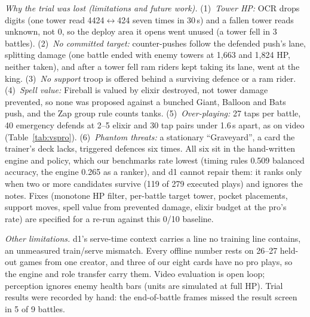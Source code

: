 \emph{Why the trial was lost (limitations and future work).} (1)~\emph{Tower HP:} OCR drops digits (one tower read 4424$\leftrightarrow$424 seven times in 30\,s) and a fallen tower reads unknown, not 0, so the deploy area it opens went unused (a tower fell in 3 battles). (2)~\emph{No committed target:} counter-pushes follow the defended push's lane, splitting damage (one battle ended with enemy towers at 1,663 and 1,824 HP, neither taken), and after a tower fell ram riders kept taking its lane, \ie went at the king. (3)~\emph{No support} troop is offered behind a surviving defence or a ram rider. (4)~\emph{Spell value:} Fireball is valued by elixir destroyed, not tower damage prevented, so none was proposed against a bunched Giant, Balloon and Bats push, and the Zap group rule counts tanks. (5)~\emph{Over-playing:} 27 taps per battle, 40 emergency defends at 2--5 elixir and 30 tap pairs under 1.6\,s apart, as on video (Table~\ref{tab:vspro}). (6)~\emph{Phantom threats:} a stationary ``Graveyard'', a card the trainer's deck lacks, triggered defences six times. All six sit in the hand-written engine and policy, which our benchmarks rate lowest (timing rules 0.509 balanced accuracy, the engine 0.265 as a ranker), and d1 cannot repair them: it ranks only when two or more candidates survive (119 of 279 executed plays) and ignores the notes. Fixes (monotone HP filter, per-battle target tower, pocket placements, support moves, spell value from prevented damage, elixir budget at the pro's rate) are specified for a re-run against this 0/10 baseline. %

\emph{Other limitations.} d1's serve-time context carries a \tw{[plan]} line no training line contains, an unmeasured train/serve mismatch. Every offline number rests on 26--27 held-out games from one creator, and three of our eight cards have no pro plays, so the engine and role transfer carry them. Video evaluation is open loop; perception ignores enemy health bars (units are simulated at full HP). Trial results were recorded by hand: the end-of-battle frames missed the result screen in 5 of 9 battles. %
